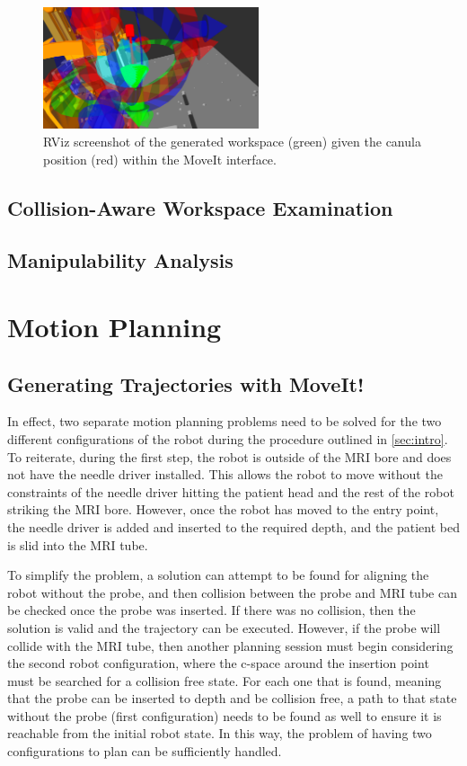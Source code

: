 \documentclass[12pt]{report}
\begin{document}
\begin{figure}[thpb]
	\centering
	\includegraphics[width = 2.5in]{images/workspace_v1.png}
    \caption{RViz screenshot of the generated workspace (green) given the canula position (red) within the MoveIt interface.}
    \label{fig:workspaceAct}
\end{figure}

\section{Collision-Aware Workspace Examination}

\section{Manipulability Analysis}


\chapter{Motion Planning}
\section{Generating Trajectories with MoveIt!}
In effect, two separate motion planning problems need to be solved for the two different configurations of the robot during the procedure outlined in \autoref{sec:intro}. To reiterate, during the first step, the robot is outside of the MRI bore and does not have the needle driver installed. This allows the robot to move without the constraints of the needle driver hitting the patient head and the rest of the robot striking the MRI bore. However, once the robot has moved to the entry point, the needle driver is added and inserted to the required depth, and the patient bed is slid into the MRI tube.

To simplify the problem, a solution can attempt to be found for aligning the robot without the probe, and then collision between the probe and MRI tube can be checked once the probe was inserted. If there was no collision, then the solution is valid and the trajectory can be executed. However, if the probe will collide with the MRI tube, then another planning session must begin considering the second robot configuration, where the c-space around the insertion point must be searched for a collision free state. For each one that is found, meaning that the probe can be inserted to depth and be collision free, a path to that state without the probe (first configuration) needs to be found as well to ensure it is reachable from the initial robot state. In this way, the problem of having two configurations to plan can be sufficiently handled.
\end{document}
